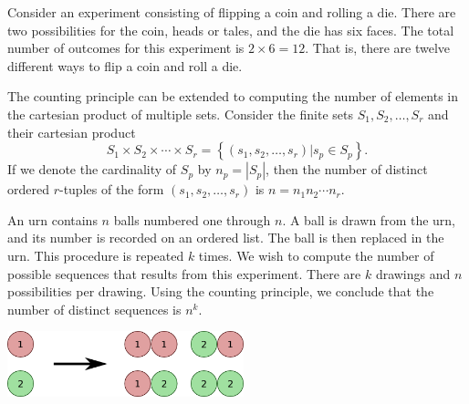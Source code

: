 \begin{example}
Consider an experiment consisting of flipping a coin and rolling a die.
There are two possibilities for the coin, heads or tales, and the die has six faces.
The total number of outcomes for this experiment is $2 \times 6 = 12$.
That is, there are twelve different ways to flip a coin and roll a die.
\end{example}

The counting principle can be extended to computing the number of elements in the cartesian product of multiple sets.
Consider the finite sets $S_1, S_2, \ldots, S_r$ and their cartesian product
\begin{equation*}
S_1 \times S_2 \times \cdots \times S_r
= \left\{ (s_1, s_2, \ldots, s_r) | s_p \in S_p \right\} .
\end{equation*}
If we denote the cardinality of $S_p$ by $n_p = | S_p |$, then the number of distinct ordered $r$-tuples of the form $(s_1, s_2, \ldots, s_r)$ is $n = n_1 n_2 \cdots n_r$.

\begin{example}
An urn contains $n$ balls numbered one through $n$.
A ball is drawn from the urn, and its number is recorded on an ordered list.
The ball is then replaced in the urn.
This procedure is repeated $k$ times.
We wish to compute the number of possible sequences that results from this experiment.
There are $k$ drawings and $n$ possibilities per drawing.
Using the counting principle, we conclude that the number of distinct sequences is $n^k$.

\begin{center}
\includegraphics[height=1.91cm]{Figures/4Chapter/sequences}
\end{center}
\end{example}

